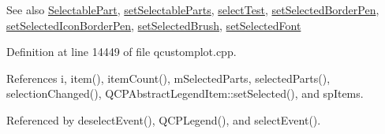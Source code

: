 \begin{DoxySeeAlso}{See also}
\hyperlink{class_q_c_p_legend_a5404de8bc1e4a994ca4ae69e2c7072f1}{Selectable\+Part}, \hyperlink{class_q_c_p_legend_a9ce60aa8bbd89f62ae4fa83ac6c60110}{set\+Selectable\+Parts}, \hyperlink{class_q_c_p_legend_aa3892801051bc7b985e003576df844db}{select\+Test}, \hyperlink{class_q_c_p_legend_a2c35d262953a25d96b6112653fbefc88}{set\+Selected\+Border\+Pen}, \hyperlink{class_q_c_p_legend_ade93aabe9bcccaf9cf46cec22c658027}{set\+Selected\+Icon\+Border\+Pen}, \hyperlink{class_q_c_p_legend_a875227f3219c9799464631dec5e8f1bd}{set\+Selected\+Brush}, \hyperlink{class_q_c_p_legend_ab580a01c3c0a239374ed66c29edf5ad2}{set\+Selected\+Font} 
\end{DoxySeeAlso}


Definition at line 14449 of file qcustomplot.\+cpp.



References i, item(), item\+Count(), m\+Selected\+Parts, selected\+Parts(), selection\+Changed(), Q\+C\+P\+Abstract\+Legend\+Item\+::set\+Selected(), and sp\+Items.



Referenced by deselect\+Event(), Q\+C\+P\+Legend(), and select\+Event().


